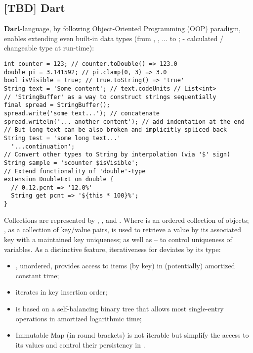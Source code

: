 
\subsection{[TBD] Dart}

\textbf{Dart}-language, by following Object-Oriented Programming (OOP) paradigm, enables extending even built-in data 
types (from , , ... to ;  - calculated / changeable type at run-time):

\begin{lstlisting}
int counter = 123; // counter.toDouble() => 123.0
double pi = 3.141592; // pi.clamp(0, 3) => 3.0
bool isVisible = true; // true.toString() => 'true'
String text = 'Some content'; // text.codeUnits // List<int>
// 'StringBuffer' as a way to construct strings sequentially
final spread = StringBuffer();
spread.write('some text...'); // concatenate
spread.writeln('... another content'); // add indentation at the end
// But long text can be also broken and implicitly spliced back
String test = 'some long text...'
  '...continuation';
// Convert other types to String by interpolation (via '$' sign)
String sample = '$counter $isVisible';
// Extend functionality of 'double'-type
extension DoubleExt on double {
  // 0.12.pcnt => '12.0%'
  String get pcnt => '${this * 100}%';
}
\end{lstlisting}

\noindent Collections are represented by , , and . Where  is an ordered collection of 
objects; , as a collection of key/value pairs, is used to retrieve a value by its associated key with a 
maintained key uniqueness; as well as  -- to control uniqueness of variables. As a distinctive feature, 
iterativeness for  deviates by its type:

\begin{itemize}
  \item {}, unordered, provides access to items (by key) in (potentially) amortized constant time;
  \item {} iterates in key insertion order;
  \item {} is based on a self-balancing binary tree that allows most single-entry operations in amortized 
  logarithmic time;
  \item Immutable Map (in round brackets) is not iterable but simplify the access to its values and control their
  persistency in .
\end{itemize}

